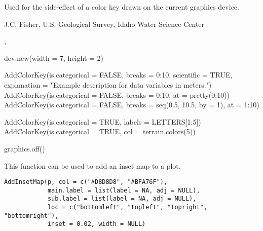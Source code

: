 \documentclass[letterpaper]{book}
\begin{document}
%
\begin{Value}
Used for the side-effect of a color key drawn on the current graphics device.
\end{Value}
%
\begin{Author}\relax
J.C. Fisher, U.S. Geological Survey, Idaho Water Science Center
\end{Author}
%
\begin{SeeAlso}\relax
{}, 
\end{SeeAlso}
%
\begin{Examples}
\begin{ExampleCode}
dev.new(width = 7, height = 2)

AddColorKey(is.categorical = FALSE, breaks = 0:10, scientific = TRUE,
            explanation = "Example description for data variables in meters.")
AddColorKey(is.categorical = FALSE, breaks = 0:10, at = pretty(0:10))
AddColorKey(is.categorical = FALSE, breaks = seq(0.5, 10.5, by = 1), at = 1:10)

AddColorKey(is.categorical = TRUE, labels = LETTERS[1:5])
AddColorKey(is.categorical = TRUE, col = terrain.colors(5))

graphics.off()
\end{ExampleCode}
\end{Examples}
%
\begin{Description}\relax
This function can be used to add an inset map to a plot.
\end{Description}
%
\begin{Usage}
\begin{verbatim}
AddInsetMap(p, col = c("#D8D8D8", "#BFA76F"),
            main.label = list(label = NA, adj = NULL),
            sub.label = list(label = NA, adj = NULL),
            loc = c("bottomleft", "topleft", "topright", "bottomright"),
            inset = 0.02, width = NULL)
\end{verbatim}
\end{Usage}
%
\end{document}

